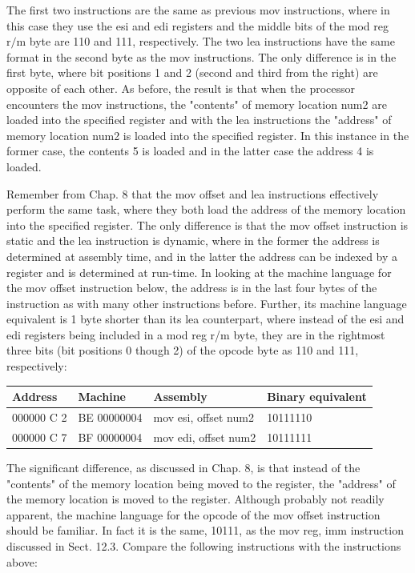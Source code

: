 \documentclass[10pt]{book}
\begin{document}
The first two instructions are the same as previous mov instructions, where in this case they use the esi and edi registers and the middle bits of the mod reg $\mathrm{r} / \mathrm{m}$ byte are 110 and 111, respectively. The two lea instructions have the same format in the second byte as the mov instructions. The only difference is in the first byte, where bit positions 1 and 2 (second and third from the right) are opposite of each other. As before, the result is that when the processor encounters the mov instructions, the "contents" of memory location num2 are loaded into the specified register and with the lea instructions the "address" of memory location num2 is loaded into the specified register. In this instance in the former case, the contents 5 is loaded and in the latter case the address 4 is loaded.


Remember from Chap. 8 that the mov offset and lea instructions effectively perform the same task, where they both load the address of the memory location into the specified register. The only difference is that the mov offset instruction is static and the lea instruction is dynamic, where in the former the address is determined at assembly time, and in the latter the address can be indexed by a register and is determined at run-time. In looking at the machine language for the mov offset instruction below, the address is in the last four bytes of the instruction as with many other instructions before. Further, its machine language equivalent is 1 byte shorter than its lea counterpart, where instead of the esi and edi registers being included in a mod reg r/m byte, they are in the rightmost three bits (bit positions 0 though 2) of the opcode byte as 110 and 111, respectively:

\begin{center}
\begin{tabular}{|l|l|l|l|}
\hline
Address & Machine & Assembly & Binary equivalent \\
\hline
000000 C 2 & BE 00000004 & mov esi, offset num2 & 10111110 \\
\hline
000000 C 7 & BF 00000004 & mov edi, offset num2 & 10111111 \\
\hline
\end{tabular}
\end{center}

The significant difference, as discussed in Chap. 8, is that instead of the "contents" of the memory location being moved to the register, the "address" of the memory location is moved to the register. Although probably not readily apparent, the machine language for the opcode of the mov offset instruction should be familiar. In fact it is the same, 10111, as the mov reg, imm instruction discussed in Sect. 12.3. Compare the following instructions with the instructions above:
\end{document}
